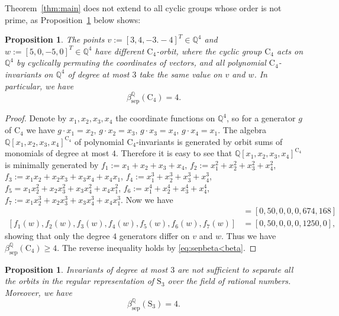 \documentclass[12pt, oneside]{amsart}
\newtheorem{proposition}[theorem]{\bf Proposition}
\def\QQ{\mathbb{Q}}
\def\sepbeta{\beta_{\mathrm{sep}}}
\begin{document}
Theorem~\ref{thm:main} does not extend to all cyclic groups whose order is not prime, 
as Proposition~\ref{prop:C4} below shows: 

\begin{proposition}\label{prop:C4} 
The points $v:=[3,4,-3.-4]^T\in \QQ^4$ and 
$w:=[5,0,-5,0]^T\in \QQ^4$ have different $\mathrm{C_4}$-orbit, 
where the cyclic group $\mathrm{C}_4$ acts on $\QQ^4$ by cyclically permuting the coordinates of vectors, and all polynomial $\mathrm{C}_4$-invariants on $\QQ^4$ of degree at most $3$ take the same value on $v$ and $w$. 
In particular, we have 
\[\sepbeta^\QQ(\mathrm{C}_4)=4.\]  
\end{proposition} 

\begin{proof}
Denote by $x_1,x_2,x_3,x_4$ the coordinate functions on $\QQ^4$, so for a generator 
$g$ of $\mathrm{C}_4$ we have $g\cdot x_1=x_2$, $g\cdot x_2=x_3$, 
$g\cdot x_3=x_4$, $g\cdot x_4=x_1$. The algebra $\QQ[x_1,x_2,x_3,x_4]^{\mathrm{C}_4}$ of polynomial $\mathrm{C}_4$-invariants is generated by orbit sums of monomials of 
degree at most $4$. Therefore it is easy to see that $\QQ[x_1,x_2,x_3,x_4]^{\mathrm{C}_4}$ is minimally generated by 
$f_1:=x_1+x_2+x_3+x_4$, 
$f_2:=x_1^2+x_2^2+x_3^2+x_4^2$, 
$f_3:=x_1x_2+x_2x_3+x_3x_4+x_4x_1$, 
$f_4:=x_1^3+x_2^3+x_3^3+x_4^3$, 
$f_5=x_1x_2^2+x_2x_3^2+x_3x_4^2+x_4x_1^2$, 
$f_6:=x_1^4 + x_2^4 + x_3^4 + x_4^4$, 
$f_7:=x_1x_2^3 + x_2x_3^3 + x_3x_4^3 + x_4x_1^3$. 
Now we have 
\begin{align*}
[f_1(v),f_2(v),f_3(v),f_4(v),f_5(v),f_6(v),f_7(v)]&=
[0, 50, 0, 0, 0, 674, 168]\\ 
[f_1(w),f_2(w),f_3(w),f_4(w),f_5(w),f_6(w),f_7(w)]&=[0, 50, 0, 0, 0, 1250, 0], 
\end{align*} 
showing that only the degree $4$ generators differ on $v$ and $w$.  
Thus we have $\sepbeta^\QQ(\mathrm{C}_4)\ge 4$. 
The reverse inequality holds by \eqref{eq:sepbeta<beta}. 
\end{proof}  

\begin{proposition}\label{prop:S3} 
Invariants of degree at most $3$ are not sufficient to separate all the orbits in 
the regular representation of $\mathrm{S}_3$ over the field of rational numbers. 
Moreover, we have 
\[\sepbeta^\QQ(\mathrm{S}_3)=4.\] 
\end{proposition} 
\end{document}
